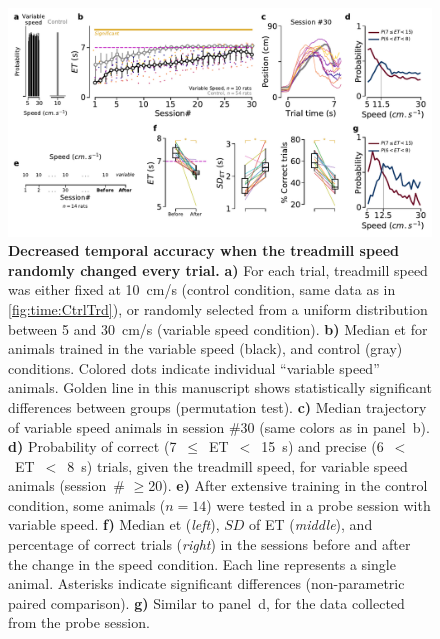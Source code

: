 \begin{figure}[bt!]
  \begin{center}
    \includegraphics[width=\textwidth]{ch-time/figures/VarTrd.pdf}
    \caption[Variable Speed Condition]
    {\textbf{Decreased temporal accuracy when the treadmill speed randomly changed every trial.}
    \textbf{a)}
    For each trial, treadmill speed was either fixed at 10~cm/s (control condition, same data as in \autoref{fig:time:CtrlTrd}), or randomly selected from a uniform distribution between 5 and 30~cm/s (variable speed condition).
    \textbf{b)}
    Median \gls{et} for animals trained in the variable speed (black), and control (gray) conditions.
    Colored dots indicate individual ``variable speed'' animals.
    Golden line in this manuscript shows statistically significant differences between groups (permutation test).
    \textbf{c)}
    Median trajectory of variable speed animals in session \#30 (same colors as in panel~b).
    \textbf{d)}
    Probability of correct (7~$\leq$~ET~$<$~15~s) and precise (6~$<$~ET~$<$~8~s) trials, given the treadmill speed, for variable speed animals (session~\# $\geq$20).
    \textbf{e)}
    After extensive training in the control condition, some animals ($n=14$) were tested in a probe session with variable speed.
    \textbf{f)}
    Median \gls{et} (\textit{left}), $SD$ of ET (\textit{middle}), and percentage of correct trials (\textit{right}) in the sessions before and after the change in the speed condition.
    Each line represents a single animal.
    Asterisks indicate significant differences (non-parametric paired comparison).
    \textbf{g)}
    Similar to panel~d, for the data collected from the probe session.
  }
  \label{fig:time:varTrd}
  \end{center}
\end{figure}